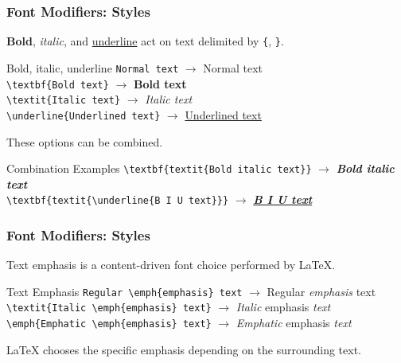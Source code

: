 \begin{frame}[fragile]
\frametitle{Font Modifiers: Styles}
\textbf{Bold}, \textit{italic}, and \underline{underline} act on text delimited by \verb|{|, \verb|}|. \pause
\begin{block}{Bold, italic, underline}
    \verb|Normal text| $\to$ Normal text \\ \pause
    \vspace{0.2cm}
    \verb|\textbf{Bold text}| $\to$ \textbf{Bold text} \\ \pause
    \vspace{0.2cm}
    \verb|\textit{Italic text}| $\to$ \textit{Italic text} \\ \pause
    \vspace{0.2cm}
    \verb|\underline{Underlined text}| $\to$ \underline{Underlined text} \\ \pause
\end{block}
These options can be combined. \pause
\begin{block}{Combination Examples}
    \verb|\textbf{textit{Bold italic text}}| $\to$ \textbf{\textit{Bold italic text}} \\
    \vspace{0.2cm}
    \verb|\textbf{textit{\underline{B I U text}}}| $\to$ \textbf{\textit{\underline{B I U text}}} \\
\end{block}
\end{frame}


\begin{frame}[fragile]
\frametitle{Font Modifiers: Styles}
Text emphasis is a content-driven font choice performed by \LaTeX{}. \pause
\begin{block}{Text Emphasis}
    \small
    \verb|Regular \emph{emphasis} text| $\to$ Regular \emph{emphasis} text \\
    \vspace{0.2cm}
    \verb|\textit{Italic \emph{emphasis} text}| $\to$ \textit{Italic} emphasis \textit{text} \\
    \vspace{0.2cm}
    \verb|\emph{Emphatic \emph{emphasis} text}| $\to$ \textit{Emphatic} emphasis \textit{text} \\
    \vspace{0.2cm}
\end{block} \pause
\LaTeX{} chooses the specific emphasis depending on the surrounding text.
\end{frame}



